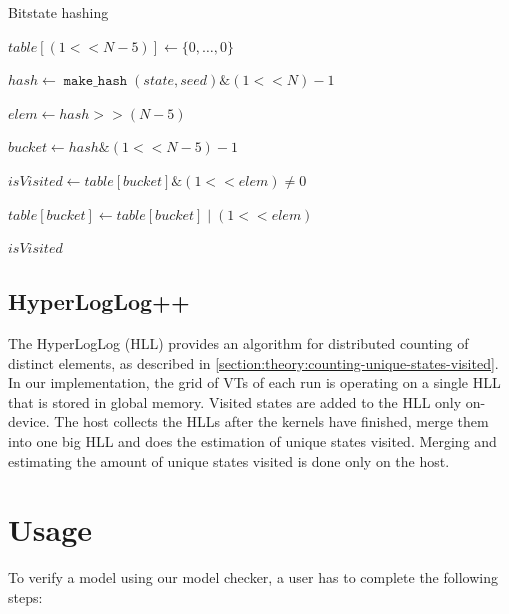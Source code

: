 \documentclass[
fancyheadings, %
%
%
]{stsreprt}
\DeclareMathOperator{\markVisited}{\texttt{mark\_visited}}
\DeclareMathOperator{\makeHash}{\texttt{make\_hash}}
\newcommand{\bitwiseAnd}{\mathbin{\text{\&}}}
\newcommand{\bitwiseOr}{\mathbin{\text{|}}}
\begin{document}
\begin{algorithm}
    \caption{Bitstate hashing}
    \label{alg:bitstate-hashing}
    \begin{algorithmic}
        \State $table[(1 << N - 5)] \gets \{0, \dots, 0\}$

        \Statex

        \Function{$\markVisited$}{state}
        \State $hash \gets \makeHash(state, seed) \bitwiseAnd (1 << N) - 1$

        \State $elem \gets hash >> (N - 5)$

        \State $bucket \gets hash \bitwiseAnd (1 << N - 5) - 1$

        \State $isVisited \gets table[bucket] \bitwiseAnd (1 << elem) \neq 0$

        \State $table[bucket] \gets table[bucket] \bitwiseOr (1 << elem)$

        \Statex

        \State \Return $isVisited$
        \EndFunction
    \end{algorithmic}
\end{algorithm}

\subsection{HyperLogLog++}

The HyperLogLog (HLL) provides an algorithm for distributed counting of distinct elements, as described in \cref{section:theory:counting-unique-states-visited}.
In our implementation, the grid of VTs of each run is operating on a single HLL that is stored in global memory.
Visited states are added to the HLL only on-device.
The host collects the HLLs after the kernels have finished, merge them into one big HLL and does the estimation of unique states visited.
Merging and estimating the amount of unique states visited is done only on the host.

\section{Usage}
\label{section:implementation:usage}

To verify a model using our model checker, a user has to complete the following steps:
\end{document}
